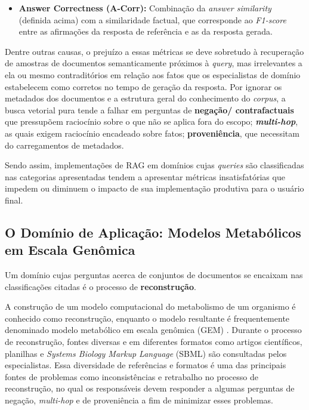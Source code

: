 \documentclass{article}
\begin{document}
\begin{itemize}
	\item \textbf{Answer Correctness (A-Corr):} Combinação da \textit{answer similarity} (definida acima) com a similaridade factual, que corresponde ao \textit{F1-score} entre as afirmações da resposta de referência e as da resposta gerada.
\end{itemize}

 Dentre outras causas, o prejuízo a essas métricas se deve sobretudo à recuperação de amostras de documentos semanticamente próximos à \textit{query}, mas irrelevantes a ela ou mesmo contraditórios em relação aos fatos que os especialistas de domínio estabelecem como corretos no tempo de geração da resposta. Por ignorar os metadados dos documentos e a estrutura geral do conhecimento do \textit{corpus}, a busca vetorial pura tende a falhar em perguntas de \textbf{negação/ contrafactuais} que pressupõem raciocínio sobre o que não se aplica fora do escopo; \textit{\textbf{multi-hop}}, as quais exigem raciocínio encadeado sobre fatos; \textbf{proveniência}, que necessitam do carregamentos de metadados.
 
 Sendo assim, implementações de RAG em domínios cujas \textit{queries} são classificadas nas categorias apresentadas tendem a apresentar métricas insatisfatórias que impedem ou diminuem o impacto de sua implementação produtiva para o usuário final.
 
 \subsection{O Domínio de Aplicação: Modelos Metabólicos em Escala Genômica}
 
 Um domínio cujas perguntas acerca de conjuntos de documentos se encaixam nas classificações citadas é o processo de \textbf{reconstrução}. 
 
 A construção de um modelo computacional do metabolismo de um organismo é conhecido como reconstrução, enquanto o modelo resultante é frequentemente denominado modelo metabólico em escala genômica (GEM) \cite{souza2025ontogem}. Durante o processo de reconstrução, fontes diversas e em diferentes formatos como artigos científicos, planilhas e \textit{Systems Biology Markup Language} (SBML) são consultadas pelos especialistas. Essa diversidade de referências e formatos é uma das principais fontes de problemas como inconsistências e retrabalho no processo de reconstrução, no qual os responsáveis devem responder a algumas perguntas de negação, \textit{multi-hop} e de proveniência a fim de minimizar esses problemas.
 
\end{document}
